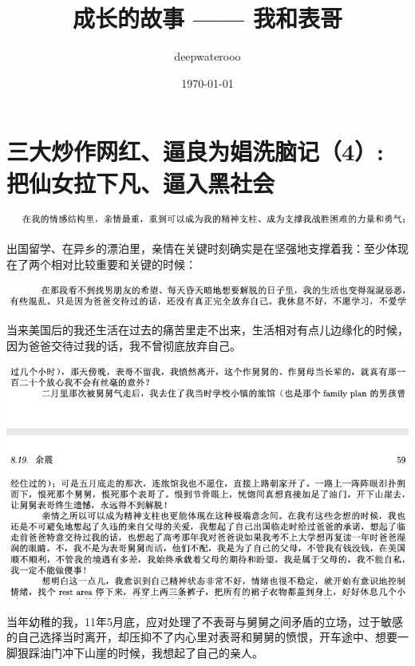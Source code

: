 \documentclass[9pt, b5paper]{article}
\author{deepwaterooo}
\date{\today}
\title{成长的故事 —— 我和表哥}
\begin{document}
\maketitle
\tableofcontents


\section{三大炒作网红、逼良为娼洗脑记（4）: 把仙女拉下凡、逼入黑社会}
\label{sec:org393252c}

\begin{center}
\includegraphics[width=.9\linewidth]{./pic/backups_plans_20210417_211023.png}
\end{center}

出国留学、在异乡的漂泊里，亲情在关键时刻确实是在坚强地支撑着我：至少体现在了两个相对比较重要和关键的时候：

\begin{center}
\includegraphics[width=.9\linewidth]{./pic/backups_plans_20210413_124318.png}
\end{center}

当来美国后的我还生活在过去的痛苦里走不出来，生活相对有点儿边缘化的时候，因为爸爸交待过我的话，我不曾彻底放弃自己。

\begin{center}
\includegraphics[width=.9\linewidth]{./pic/backups_plans_20210413_124604.png}
\end{center}

当年幼稚的我，11年5月底，应对处理了不表哥与舅舅之间矛盾的立场，过于敏感的自己选择当时离开，却压抑不了内心里对表哥和舅舅的愤恨，开车途中、想要一脚狠踩油门冲下山崖的时候，我想起了自己的亲人。
\end{document}
